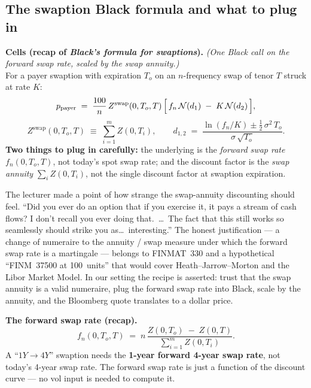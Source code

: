 \subsection{The swaption Black formula and what to plug in}\label{L7-sec:swaption-blackrecap}

\begin{keyblock}
\textbf{Cells (recap of \emph{Black's formula for swaptions}).}
\emph{(One Black call on the forward swap rate, scaled by the swap
annuity.)}\\
For a payer swaption with expiration $T_o$ on an $n$-frequency swap of
tenor $T$ struck at rate $K$:
\[
  p_{\text{payer}}
     \;=\; \frac{100}{n}\,Z^{\text{swap}}(0, T_o, T)\,
        \Bigl[\, f_n\,\mathcal{N}(d_1) \;-\; K\,\mathcal{N}(d_2)\,\Bigr],
\]
\[
  Z^{\text{swap}}(0, T_o, T) \;\equiv\; \sum_{i = 1}^{m} Z(0, T_i),
  \qquad
  d_{1,2} \;=\;
       \frac{\ln(f_n / K) \pm \tfrac{1}{2}\,\sigma^2\,T_o}
            {\sigma\,\sqrt{T_o}}.
\]
\textbf{Two things to plug in carefully:} the underlying is the
\emph{forward swap rate} $f_n(0, T_o, T)$, not today's spot swap rate;
and the discount factor is the \emph{swap annuity}
$\sum_i Z(0, T_i)$, not the single discount factor at swaption
expiration.
\end{keyblock}

The lecturer made a point of how strange the swap-annuity discounting
should feel. ``Did you ever do an option that if you exercise it, it
pays a stream of cash flows? I don't recall you ever doing that.\ \ldots\
The fact that this still works so seamlessly should strike you as\ldots\
interesting.'' The honest justification --- a change of numeraire to
the annuity / swap measure under which the forward swap rate is a
martingale --- belongs to FINMAT~330 and a hypothetical
``FINM~37500 at 100~units'' that would cover Heath--Jarrow--Morton and
the Libor Market Model. In our setting the recipe is asserted: trust
that the swap annuity is a valid numeraire, plug the forward swap
rate into Black, scale by the annuity, and the Bloomberg quote
translates to a dollar price.

\begin{keyblock}
\textbf{The forward swap rate (recap).}
\[
  f_n(0, T_o, T) \;=\; n\,
        \frac{Z(0, T_o) \;-\; Z(0, T)}{\sum_{i = 1}^{m} Z(0, T_i)}.
\]
A ``$1Y \to 4Y$'' swaption needs the \textbf{1-year forward 4-year
swap rate}, not today's 4-year swap rate. The forward swap rate is
just a function of the discount curve --- no vol input is needed to
compute it.
\end{keyblock}

